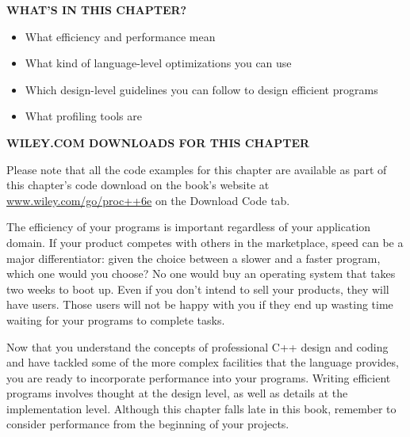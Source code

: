 \noindent
\textbf{WHAT’S IN THIS CHAPTER?}

\begin{itemize}
\item
What efficiency and performance mean

\item
What kind of language-level optimizations you can use

\item
Which design-level guidelines you can follow to design efficient programs

\item
What profiling tools are
\end{itemize}

\noindent
\textbf{WILEY.COM DOWNLOADS FOR THIS CHAPTER}

Please note that all the code examples for this chapter are available as part of this chapter’s code download on the book’s website at \url{www.wiley.com/go/proc++6e} on the Download Code tab.

The efficiency of your programs is important regardless of your application domain. If your product competes with others in the marketplace, speed can be a major differentiator: given the choice between a slower and a faster program, which one would you choose? No one would buy an operating system that takes two weeks to boot up. Even if you don’t intend to sell your products, they will have users. Those users will not be happy with you if they end up wasting time waiting for your programs to complete tasks.

Now that you understand the concepts of professional C++ design and coding and have tackled some of the more complex facilities that the language provides, you are ready to incorporate performance into your programs. Writing efficient programs involves thought at the design level, as well as details at the implementation level. Although this chapter falls late in this book, remember to consider performance from the beginning of your projects.














